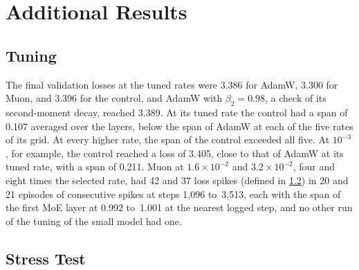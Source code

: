 \documentclass[11pt, a4paper]{article}
\begin{document}
\section{Additional Results}
\label{app:results}

\subsection{Tuning}
\label{app:tuning}

The final validation losses at the tuned rates were 3.386 for AdamW, 3.300 for Muon, and 3.396 for the control, and AdamW with $\beta_2 = 0.98$, a check of its second-moment decay, reached 3.389. At its tuned rate the control had a span of 0.107 averaged over the layers, below the span of AdamW at each of the five rates of its grid. At every higher rate, the span of the control exceeded all five. At $10^{-3}$, for example, the control reached a loss of 3.405, close to that of AdamW at its tuned rate, with a span of 0.211. Muon at $1.6 \times 10^{-2}$ and $3.2 \times 10^{-2}$, four and eight times the selected rate, had 42 and 37 loss spikes (defined in \cref{app:stress}) in 20 and 21 episodes of consecutive spikes at steps 1,096 to~3,513, each with the span of the first MoE layer at 0.992 to~1.001 at the nearest logged step, and no other run of the tuning of the small model had one.

\subsection{Stress Test}
\label{app:stress}
\end{document}
